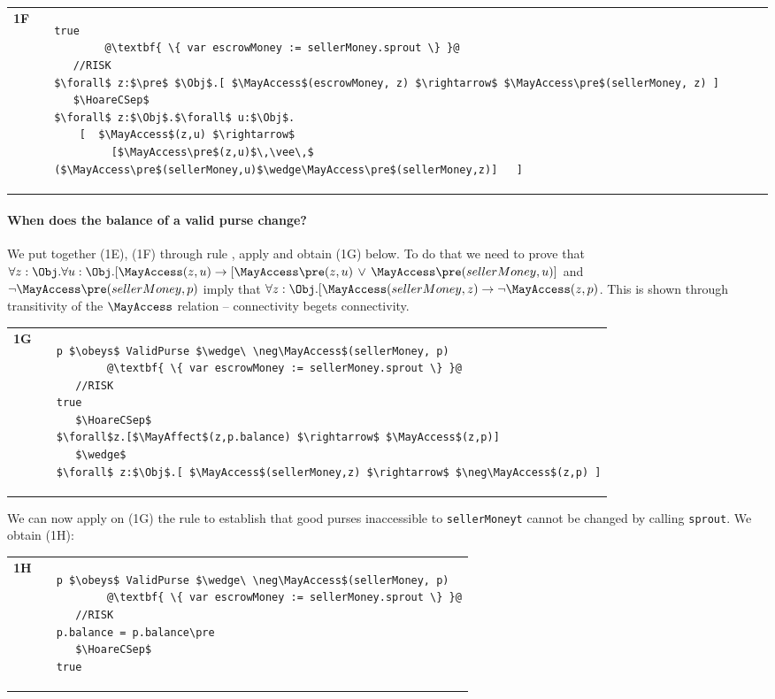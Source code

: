 \begin{tabular}{lll}
{\bf 1F} & &
\begin{lstlisting}[escapechar=@]
true
        @\textbf{ \{ var escrowMoney := sellerMoney.sprout \} }@
   //RISK
$\forall$ z:$\pre$ $\Obj$.[ $\MayAccess$(escrowMoney, z) $\rightarrow$ $\MayAccess\pre$(sellerMoney, z) ]
   $\HoareCSep$
$\forall$ z:$\Obj$.$\forall$ u:$\Obj$.
    [  $\MayAccess$(z,u) $\rightarrow$
         [$\MayAccess\pre$(z,u)$\,\vee\,$ ($\MayAccess\pre$(sellerMoney,u)$\wedge\MayAccess\pre$(sellerMoney,z)]   ]
\end{lstlisting}
\end{tabular}

\vspace{.02in}
\paragraph{When does the balance of a valid purse change?}

We put together (1E), (1F) through rule , apply  and obtain (1G) below. To do that we need to prove that 
$\forall z:\Obj.\forall u: \Obj.
[ \MayAccess(z, u)\rightarrow[\MayAccess\pre(z, u) \,\vee\, \MayAccess\pre(sellerMoney, u)]$ and $\neg\MayAccess\pre(sellerMoney, p)$  imply that 
$\forall z:\Obj.[\MayAccess(sellerMoney, z) \rightarrow
\neg\MayAccess(z, p)$. This is shown through transitivity of the $\MayAccess$ relation -- connectivity begets connectivity. 


\begin{tabular}{lll}
{\bf 1G} & &
\begin{lstlisting}[escapechar=@]
p $\obeys$ ValidPurse $\wedge\ \neg\MayAccess$(sellerMoney, p) 
        @\textbf{ \{ var escrowMoney := sellerMoney.sprout \} }@
   //RISK
true
   $\HoareCSep$
$\forall$z.[$\MayAffect$(z,p.balance) $\rightarrow$ $\MayAccess$(z,p)]
   $\wedge$
$\forall$ z:$\Obj$.[ $\MayAccess$(sellerMoney,z) $\rightarrow$ $\neg\MayAccess$(z,p) ]
\end{lstlisting}
\end{tabular}
 

We can now  apply on (1G) the rule  to establish that
 good purses inaccessible to \lstinline+sellerMoneyt+ cannot be changed by calling
\lstinline+sprout+. We obtain (1H): 

\begin{tabular}{lll}
{\bf 1H} & &
\begin{lstlisting}[escapechar=@]
p $\obeys$ ValidPurse $\wedge\ \neg\MayAccess$(sellerMoney, p) 
        @\textbf{ \{ var escrowMoney := sellerMoney.sprout \} }@
   //RISK
p.balance = p.balance\pre  
   $\HoareCSep$
true   
   \end{lstlisting}
\end{tabular}

